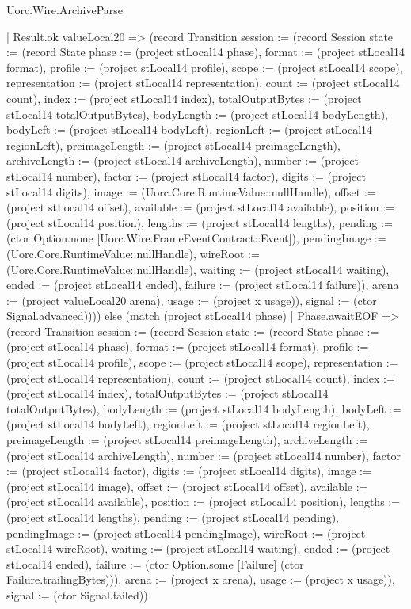 \begin{lexlean}{Uorc.Wire.ArchiveParse}
\begin{semanticmodule}
{        | Result.ok valueLocal20 => (record Transition {session := (record Session {state := (record State {phase := (project stLocal14 phase), format := (project stLocal14 format), profile := (project stLocal14 profile), scope := (project stLocal14 scope), representation := (project stLocal14 representation), count := (project stLocal14 count), index := (project stLocal14 index), totalOutputBytes := (project stLocal14 totalOutputBytes), bodyLength := (project stLocal14 bodyLength), bodyLeft := (project stLocal14 bodyLeft), regionLeft := (project stLocal14 regionLeft), preimageLength := (project stLocal14 preimageLength), archiveLength := (project stLocal14 archiveLength), number := (project stLocal14 number), factor := (project stLocal14 factor), digits := (project stLocal14 digits), image := (Uorc.Core.RuntimeValue::nullHandle), offset := (project stLocal14 offset), available := (project stLocal14 available), position := (project stLocal14 position), lengths := (project stLocal14 lengths), pending := (ctor Option.none [Uorc.Wire.FrameEventContract::Event]), pendingImage := (Uorc.Core.RuntimeValue::nullHandle), wireRoot := (Uorc.Core.RuntimeValue::nullHandle), waiting := (project stLocal14 waiting), ended := (project stLocal14 ended), failure := (project stLocal14 failure)}), arena := (project valueLocal20 arena), usage := (project x usage)}), signal := (ctor Signal.advanced)}))) else (match (project stLocal14 phase)
        | Phase.awaitEOF => (record Transition {session := (record Session {state := (record State {phase := (project stLocal14 phase), format := (project stLocal14 format), profile := (project stLocal14 profile), scope := (project stLocal14 scope), representation := (project stLocal14 representation), count := (project stLocal14 count), index := (project stLocal14 index), totalOutputBytes := (project stLocal14 totalOutputBytes), bodyLength := (project stLocal14 bodyLength), bodyLeft := (project stLocal14 bodyLeft), regionLeft := (project stLocal14 regionLeft), preimageLength := (project stLocal14 preimageLength), archiveLength := (project stLocal14 archiveLength), number := (project stLocal14 number), factor := (project stLocal14 factor), digits := (project stLocal14 digits), image := (project stLocal14 image), offset := (project stLocal14 offset), available := (project stLocal14 available), position := (project stLocal14 position), lengths := (project stLocal14 lengths), pending := (project stLocal14 pending), pendingImage := (project stLocal14 pendingImage), wireRoot := (project stLocal14 wireRoot), waiting := (project stLocal14 waiting), ended := (project stLocal14 ended), failure := (ctor Option.some [Failure] (ctor Failure.trailingBytes))}), arena := (project x arena), usage := (project x usage)}), signal := (ctor Signal.failed)})
}
\end{semanticmodule}
\end{lexlean}
